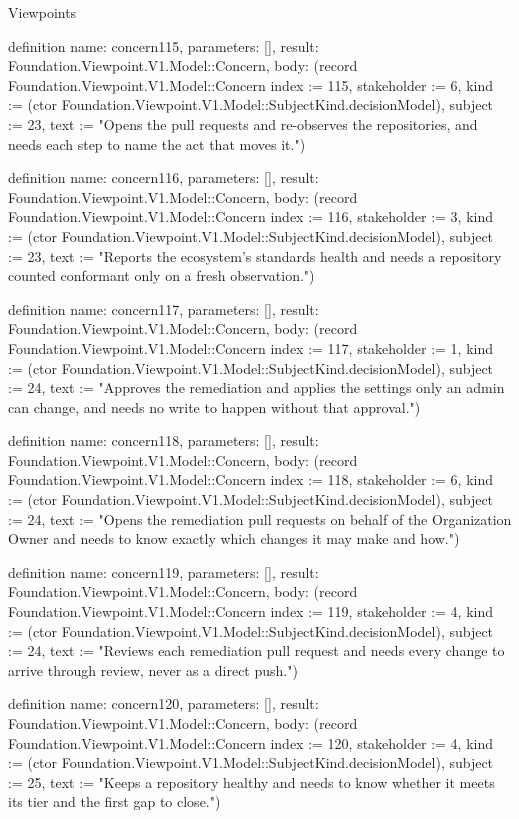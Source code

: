 \begin{lexlean}{Viewpoints}
\begin{semanticmodule}
definition{
  name: concern115,
  parameters: [],
  result: Foundation.Viewpoint.V1.Model::Concern,
  body: (record Foundation.Viewpoint.V1.Model::Concern {index := 115, stakeholder := 6, kind := (ctor Foundation.Viewpoint.V1.Model::SubjectKind.decisionModel), subject := 23, text := "Opens the pull requests and re-observes the repositories, and needs each step to name the act that moves it."})
}

definition{
  name: concern116,
  parameters: [],
  result: Foundation.Viewpoint.V1.Model::Concern,
  body: (record Foundation.Viewpoint.V1.Model::Concern {index := 116, stakeholder := 3, kind := (ctor Foundation.Viewpoint.V1.Model::SubjectKind.decisionModel), subject := 23, text := "Reports the ecosystem's standards health and needs a repository counted conformant only on a fresh observation."})
}

definition{
  name: concern117,
  parameters: [],
  result: Foundation.Viewpoint.V1.Model::Concern,
  body: (record Foundation.Viewpoint.V1.Model::Concern {index := 117, stakeholder := 1, kind := (ctor Foundation.Viewpoint.V1.Model::SubjectKind.decisionModel), subject := 24, text := "Approves the remediation and applies the settings only an admin can change, and needs no write to happen without that approval."})
}

definition{
  name: concern118,
  parameters: [],
  result: Foundation.Viewpoint.V1.Model::Concern,
  body: (record Foundation.Viewpoint.V1.Model::Concern {index := 118, stakeholder := 6, kind := (ctor Foundation.Viewpoint.V1.Model::SubjectKind.decisionModel), subject := 24, text := "Opens the remediation pull requests on behalf of the Organization Owner and needs to know exactly which changes it may make and how."})
}

definition{
  name: concern119,
  parameters: [],
  result: Foundation.Viewpoint.V1.Model::Concern,
  body: (record Foundation.Viewpoint.V1.Model::Concern {index := 119, stakeholder := 4, kind := (ctor Foundation.Viewpoint.V1.Model::SubjectKind.decisionModel), subject := 24, text := "Reviews each remediation pull request and needs every change to arrive through review, never as a direct push."})
}

definition{
  name: concern120,
  parameters: [],
  result: Foundation.Viewpoint.V1.Model::Concern,
  body: (record Foundation.Viewpoint.V1.Model::Concern {index := 120, stakeholder := 4, kind := (ctor Foundation.Viewpoint.V1.Model::SubjectKind.decisionModel), subject := 25, text := "Keeps a repository healthy and needs to know whether it meets its tier and the first gap to close."})
}


\end{semanticmodule}
\end{lexlean}
